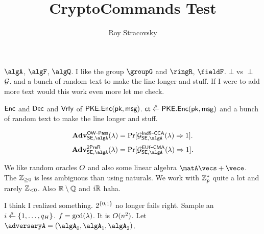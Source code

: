 \documentclass[11pt, oneside]{article}
\title{CryptoCommands Test}
\author{Roy Stracovsky}
\begin{document}
\maketitle

$\algA$, $\algF$, $\algQ$. I like the group $\groupG$ and $\ringR$, $\fieldF$. $\bot$ vs $\perp$
$\mathcal{G}$. and a bunch of random text to make the line longer and stuff. If I were to add more text would this work even more let me check.

$\mathsf{Enc}$ and $\mathsf{Dec}$ and $\mathsf{Vrfy}$ of $\mathsf{PKE}.\mathsf{Enc}(\mathsf{pk}, \mathsf{msg})$.
$\ct \sample \PKEncScheme.\PKEnc(\pk, \msg)$ and a bunch of random text to make the line longer and stuff.

$$ \Adv{\OWPass}{\SEncScheme, \algA}{\secpar} = \Pr[\game^\IndRCCA_{\SEncScheme, \algA}(\secpar) \outputs 1].$$
$$ \Adv{\SecPreimageRes}{\SEncScheme, \algA}{\secpar} = \Pr[\game^\EUfCMA_{\SEncScheme, \algA}(\secpar) \outputs 1].$$

We like random oracles $O$ and also some linear algebra $\matA\vecs + \vece$. The ${\mathbb{Z}_{\ge 0}}$ is less ambiguous than using naturals.
We work with ${\mathbb{Z}^\ast_{p}}$ quite a lot and rarely ${\mathbb{Z}_{< 0}}$. Also ${\mathbb{R} \setminus \mathbb{Q}}$ and ${i\mathbb{R}}$ haha.

I think I realized something. $2^{\{0, 1\}}$ no longer fails right.
Sample an $i \sample \Range{1}{q_H}$. $f = \gcd(\lambda)$. It is $O(n^2)$.
Let $\adversaryA = (\algA_0, \algA_1, \algA_2)$.  
\end{document}
